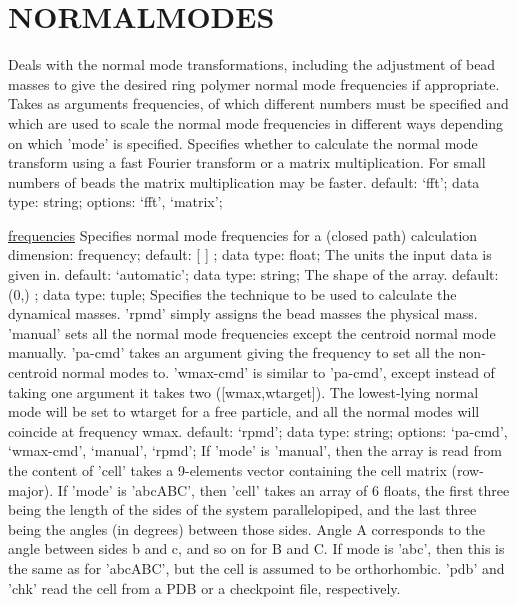 \section{NORMALMODES}
\label{NORMALMODES}
\begin{ipifield}{}%
{Deals with the normal mode transformations, including the adjustment of bead masses to give the desired ring polymer normal mode frequencies if appropriate. Takes as arguments frequencies, of which different numbers must be specified and which are used to scale the normal mode frequencies in different ways depending on which 'mode' is specified.}%
{}%
{%
{Specifies whether to calculate the normal mode transform using a fast Fourier transform or a matrix multiplication. For small numbers of beads the matrix multiplication may be faster.}%
{default: `fft'; data type: string; options: `fft', `matrix'; }%
}
\begin{ipifield}{\hyperref[NMFREQUENCIES]{frequencies}}%
{Specifies normal mode frequencies for a (closed path) calculation}%
{dimension: frequency; default:  [ ] ; data type: float; }%
{%
{The units the input data is given in.}%
{default: `automatic'; data type: string; }%
%
{The shape of the array.}%
{default:  (0,) ; data type: tuple; }%
%
{Specifies the technique to be used to calculate the dynamical masses.
                                                'rpmd' simply assigns the bead masses the physical mass.
                                                'manual' sets all the normal mode frequencies except the centroid normal mode manually.
                                                'pa-cmd' takes an argument giving the frequency to set all the non-centroid normal modes to.
                                                'wmax-cmd' is similar to 'pa-cmd', except instead of taking one argument it takes two
                                                      ([wmax,wtarget]). The lowest-lying normal mode will be set to wtarget for a
                                                      free particle, and all the normal modes will coincide at frequency wmax. }%
{default: `rpmd'; data type: string; options: `pa-cmd', `wmax-cmd', `manual', `rpmd'; }%
%
{If 'mode' is 'manual', then the array is read from the content of 'cell' takes a 9-elements vector containing the cell matrix (row-major). If 'mode' is 'abcABC', then 'cell' takes an array of 6 floats, the first three being the length of the sides of the system parallelopiped, and the last three being the angles (in degrees) between those sides. Angle A corresponds to the angle between sides b and c, and so on for B and C. If mode is 'abc', then this is the same as for 'abcABC', but the cell is assumed to be orthorhombic. 'pdb' and 'chk' read the cell from a PDB or a checkpoint file, respectively.}%
}
\end{ipifield}
\end{ipifield}
